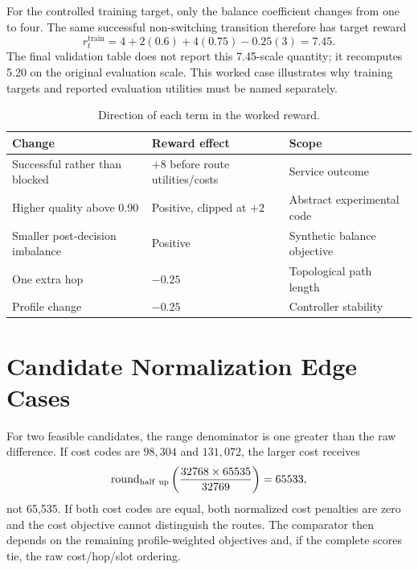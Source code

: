 For the controlled training target, only the balance coefficient changes from one
to four. The same successful non-switching transition therefore has target reward
\begin{equation}
r_t^{\mathrm{train}}=4+2(0.6)+4(0.75)-0.25(3)=7.45.
\end{equation}
The final validation table does not report this 7.45-scale quantity; it recomputes
5.20 on the original evaluation scale. This worked case illustrates why training
targets and reported evaluation utilities must be named separately.

\begin{table}[H]
\centering
\caption{Direction of each term in the worked reward.}
\label{tab:worked-reward-directions}
\begin{tabularx}{\textwidth}{@{}p{}p{}X@{}}
\toprule
\textbf{Change} & \textbf{Reward effect} & \textbf{Scope}\\
\midrule
Successful rather than blocked & $+8$ before route utilities/costs & Service outcome\\
Higher quality above 0.90 & Positive, clipped at $+2$ & Abstract experimental code\\
Smaller post-decision imbalance & Positive & Synthetic balance objective\\
One extra hop & $-0.25$ & Topological path length\\
Profile change & $-0.25$ & Controller stability\\
\bottomrule
\end{tabularx}
\end{table}

\section{Candidate Normalization Edge Cases}

For two feasible candidates, the range denominator is one greater than the raw
difference. If cost codes are $98{,}304$ and $131{,}072$, the larger cost receives
\begin{equation}
\operatorname{round}_{\rm half\ up}
\left(\frac{32768\times65535}{32769}\right)=65533,
\end{equation}
not 65,535. If both cost codes are equal, both normalized cost penalties are zero
and the cost objective cannot distinguish the routes. The comparator then depends
on the remaining profile-weighted objectives and, if the complete scores tie, the
raw cost/hop/slot ordering.

